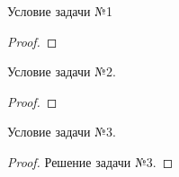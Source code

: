 
\renewcommand*{\proofname}{Решение}

\begin{problem}
	Условие задачи №1
\end{problem}

\begin{proof}

\end{proof}

\begin{problem}
	Условие задачи №2.
\end{problem}

\begin{proof}

\end{proof}

\begin{problem}
	Условие задачи №3.
\end{problem}

\begin{proof}
	Решение задачи №3.
\end{proof}
